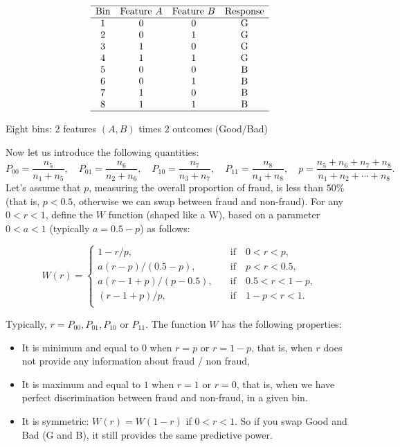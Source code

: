 \documentclass[oneside,10pt]{book}
\renewcommand{\arraystretch}{1.4} %
\begin{document}
\renewcommand{\arraystretch}{1.2} %
\begin{table}[H]
\small
\[
\begin{array}{cccc}
\hline
 \mbox{Bin} &  \text{Feature } A & \text{Feature } B & \text{Response} \\
\hline
 1  & 0 & 0 & \text{G} \\
2  & 0 & 1 & \text{G} \\
 3  & 1 & 0 & \text{G} \\
4  & 1 & 1 & \text{G} \\
5  & 0 & 0 & \text{B} \\
6  & 0 & 1 & \text{B} \\
 7  & 1 & 0 & \text{B}\\
8  & 1 & 1 & \text{B} \\
\hline
\end{array}
\]
\caption{\label{tabnbv45} Eight bins: $2$ features $(A, B)$ times $2$ outcomes (Good/Bad)}
\end{table}
\noindent Now let us introduce the following quantities:
$$
P_{00} = \frac{n_5}{n_1 + n_5}, \quad P_{01} = \frac{n_6}{n_2 + n_6}, \quad P_{10} = \frac{n_7}{n_3 + n_7}, \quad P_{11} = \frac{n_8}{n_4 + n_8},\quad
p = \frac{n_5 + n_6 + n_7 + n_8}{n_1 + n_2 +\cdots + n_8}.
$$
Let’s assume that $p$, measuring the overall proportion of fraud, is less than $50\%$ (that is, $p < 0.5$, otherwise we can swap between fraud and non-fraud). For any
$0<r<1$,  define the $W$ function (shaped like a W), based on a parameter $0<a<1$ (typically $a = 0.5 - p$) as follows:

\[
W(r) =
     \begin{cases}
       1 - r / p, &\quad\text{if }\text{ } 0 < r < p, \\
        a (r - p) / (0.5 - p), &\quad\text{if }\text{ } p < r < 0.5,\\
       a (r - 1 + p) / (p - 0.5),&\quad\text{if }\text{ } 0.5 < r < 1 - p,\\
       (r - 1 + p) / p, &\quad\text{if }\text{ }  1- p < r < 1.\\
     \end{cases}
\]

\noindent Typically, $r = P_{00}, P_{01}, P_{10}$ or $P_{11}$. The  function $W$ has the following properties:\vspace{1ex}
\begin{itemize}
	\item It is minimum and equal to $0$ when $r  = p$ or $r = 1 - p$, that is, when $r$ does not provide any information about fraud / non fraud,
	\item It is maximum and equal to $1$ when $r = 1$ or $r = 0$, that is, when we have perfect discrimination between fraud and non-fraud, in a given bin.
	\item It is symmetric: $W(r) = W(1 - r)$ if $0 < r < 1$. So if you swap Good and Bad (G and B), it still provides the same predictive power.
\end{itemize}\vspace{1ex}
\end{document}
